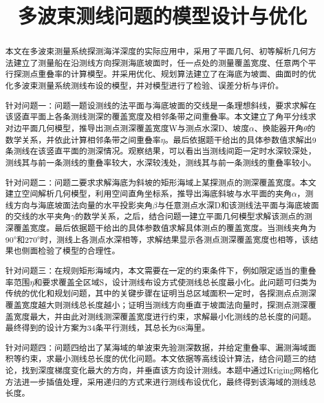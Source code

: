 \documentclass[withoutpreface,bwprint]{cumcmthesis} %
\title{多波束测线问题的模型设计与优化}
\begin{document}
 \maketitle
\thispagestyle{empty}
 \begin{abstract}
本文在多波束测量系统探测海洋深度的实际应用中，采用了平面几何、初等解析几何方法建立了测量船在沿测线方向探测海底坡面时，任一点处的测量覆盖宽度、任意两个平行探测点重叠率的计算模型。并采用优化、规划算法建立了在海底为坡面、曲面时的优化多波束测量系统测线布设的模型，并对模型进行了检验、误差分析与评价。

针对问题一：问题一题设测线的法平面与海底坡面的交线是一条理想斜线，要求求解在该竖直平面上各条测线测深的覆盖宽度及相邻条带之间重叠率。本文建立了角平分线求对边平面几何模型，推导出测点测深覆盖宽度W与测点水深D、坡度$\alpha$、换能器开角$\theta$的数学关系，并依此计算相邻条带之间重叠率$\eta$。最后依据题干给出的具体参数值求解出9条测线在该竖直平面的测深情况。观察结果，可以看出当测线间距一定时水深较深处，测线其与前一条测线的重叠率较大，水深较浅处，测线其与前一条测线的重叠率较小。

针对问题二：问题二要求求解海底为斜坡的矩形海域上某探测点的测深覆盖宽度。本文建立空间解析几何模型，利用空间直角坐标系，推导出海底斜坡与水平面的夹角$\alpha$，测线方向与海底坡面法向量的水平投影夹角$\beta$与任意测点水深D和该测线法平面与海底坡面的交线的水平夹角$\gamma$的数学关系，之后，结合问题一建立平面几何模型求解该测点的测深覆盖宽度。最后依据题干给出的具体参数值求解具体测点的覆盖宽度。当测线夹角为90°和270°时，测线上各测点水深相等，求解结果显示各测点测深覆盖宽度也相等，该结果也侧面检验了模型的合理性。

针对问题三：在规则矩形海域内，本文需要在一定的约束条件下，例如限定适当的重叠率范围$\eta$和要求覆盖全区域S，设计测线布设方式使测线总长度最小化。此问题可归类为传统的优化和规划问题，其中的关键步骤在证明当总区域面积一定时，各探测点点测深覆盖宽度越大则测线总长度越小；证明当测线方向垂直于坡面法向量时，探测点测深覆盖宽度最大，并由此对测线测深覆盖宽度进行约束，求解最小化测线的总长度的问题。最终得到的设计方案为34条平行测线，其总长为68海里。

针对问题四：问题四给出了某海域的单波束先验测深数据，并给定重叠率、漏测海域面积等约束，求最小测线总长度的优化问题。本文依据等高线设计算法，结合问题三的结论，找到深度梯度变化最大的方向，并垂直该方向设计测线。本题中通过Kriging网格化方法进一步插值处理，采用递归的方式来进行测线布设优化，最终得到该海域的测线总长度。

\end{abstract}
\end{document}
